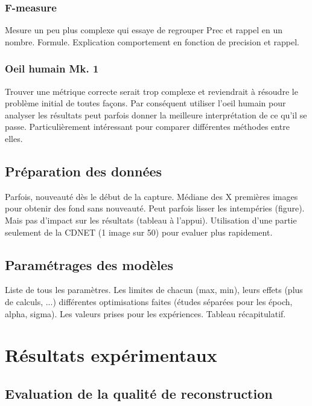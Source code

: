 	\subsubsection{F-measure}

	Mesure un peu plus complexe qui essaye de regrouper Prec et rappel en un nombre. Formule. Explication comportement en fonction de precision et rappel.

	\subsubsection{Oeil humain Mk. 1}

	Trouver une métrique correcte serait trop complexe et reviendrait à résoudre le problème initial de toutes façons. Par conséquent utiliser l'oeil humain pour analyser les résultats peut parfois donner la meilleure interprétation de ce qu'il se passe. Particulièrement intéressant pour comparer différentes méthodes entre elles.

	\subsection{Préparation des données}

	Parfois, nouveauté dès le début de la capture. Médiane des X premières images pour obtenir des fond sans nouveauté. Peut parfois lisser les intempéries (figure). Mais pas d'impact sur les résultats (tableau à l'appui). Utilisation d'une partie seulement de la CDNET (1 image sur 50) pour evaluer plus rapidement.

	\subsection{Paramétrages des modèles}

	Liste de tous les paramètres. Les limites de chacun (max, min), leurs effets (plus de calculs, ...) différentes optimisations faites (études séparées pour les époch, alpha, sigma). Les valeurs prises pour les expériences. Tableau récapitulatif.

	\newpage

	\section{Résultats expérimentaux}
	\subsection{Evaluation de la qualité de reconstruction}

